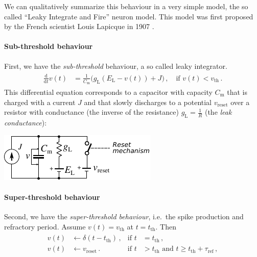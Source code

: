 \documentclass[10pt,letterpaper,oneside]{article}
\begin{document}
We can qualitatively summarize this behaviour in a very simple model, the so called \enquote{Leaky Integrate and Fire} neuron model. This model was first proposed by the French scientist Louis Lapicque in 1907 \cite{lapicque1907recherches,abbott1999lapicque}.

\paragraph{Sub-threshold behaviour}
First, we have the \emph{sub-threshold} behaviour, a so called leaky integrator.
\begin{align}
	\begin{aligned}
		\frac{\mathrm{d}}{\mathrm{d}t} v(t) &= \frac{1}{C_\mathrm{m}} \big(g_\mathrm{L} (E_\mathrm{L} - v(t))
			+ J
		\big) \,, \quad \text{if } v(t) < v_\mathrm{th}\,.
	\end{aligned}
	\label{eqn:sub-threshold}
\end{align}
This differential equation corresponds to a capacitor with capacity $C_\mathrm{m}$ that is charged with a current $J$ and that slowly discharges to a potential $v_\mathrm{reset}$ over a resistor with conductance (the inverse of the resistance) $g_\mathrm{L} = \frac{1}{R}$ (the \emph{leak conductance}):
\begin{center}
	\hspace{2.5cm}\includegraphics[scale=1.5]{media/lif_circuit.pdf}
\end{center}

\paragraph{Super-threshold behaviour}
Second, we have the \emph{super-threshold behaviour}, i.e.~the spike production and refractory period. Assume $v(t) = v_\mathrm{th}$ at $t = t_\mathrm{th}$. Then
\begin{align}
	\begin{aligned}
		v(t) &\gets \delta(t - t_\mathrm{th}) \,, &\text{if } t &= t_\mathrm{th} \,,\\
		v(t) &\gets v_\mathrm{reset} \,. &\text{if } t &> t_\mathrm{th} \text{ and } t \geq t_\mathrm{th} + \tau_\mathrm{ref} \,,
	\end{aligned}
	\label{eqn:super-threshold}
\end{align}
\end{document}
